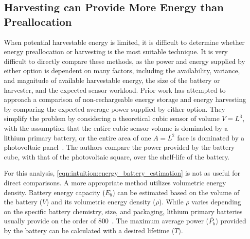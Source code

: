 \subsection{Harvesting can Provide More Energy than Preallocation}
\label{sec:intuition:energy_income_pvh}
When potential harvestable energy is limited, it is difficult to determine whether energy preallocation or harvesting is the most suitable technique.
It is very difficult to directly compare these methods, as the power and energy supplied by either option is dependent on many factors, including the availability, variance, and magnitude of available harvestable energy, the size of the battery or harvester, and the expected sensor workload. 
Prior work has attempted to approach a comparison of non-rechargeable energy storage and energy harvesting by comparing the expected average power supplied by either option. 
They simplify the problem by considering a theoretical cubic sensor of volume $V = L^3$, 
with the assumption that the entire cubic sensor volume is dominated by a lithium primary battery, or the entire area of one $A = L^2$ face is dominated by a photovoltaic panel~\cite{yervaGrafting12}.
The authors compare the power provided by the battery cube, with that of the photovoltaic square, over the shelf-life of the battery. 

For this analysis, \cref{eqn:intuition:energy_battery_estimation} is not as useful for direct comparisons. 
A more appropriate method utilizes volumetric energy density.
Battery energy capacity ($E_b$) can be estimated based on the volume of the battery ($V$) and its volumetric energy density ($\rho$).
While $\rho$ varies depending on the specific battery chemistry, size, and packaging, lithium primary batteries usually provide on the order of 800\ssi[per-mode=symbol]{\milli\Wh\per\cm\cubed}~\cite{tuna2016energy}. The maximum average power ($\bar{P_b}$) provided by the battery can be calculated with a desired lifetime ($T$). 

